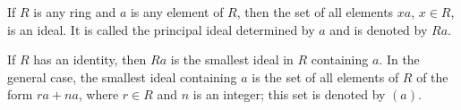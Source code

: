 If $R$ is any ring and $a$ is any element of $R$, then the set of all elements $xa$, $x \in R$, is an ideal. It is called the principal ideal determined by $a$ and is denoted by $Ra$.

If $R$ has an identity, then $Ra$ is the smallest ideal in $R$ containing $a$. In the general case, the smallest ideal containing $a$ is the set of all elements of $R$ of the form $ra + na$, where $r \in R$ and $n$ is an integer; this set is denoted by $(a)$.
